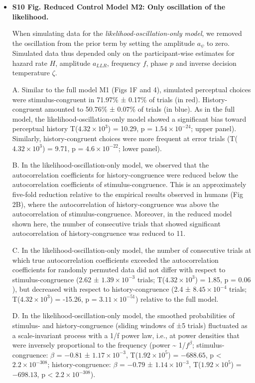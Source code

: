 \documentclass[
]{article}
\begin{document}
\begin{itemize}
\item \textbf{S10 Fig. Reduced Control Model M2: Only oscillation of the likelihood.}

When simulating data for the
\emph{likelihood-oscillation-only model}, we removed the oscillation
from the prior term by setting the amplitude \(a_{\psi}\) to zero.
Simulated data thus depended only on the participant-wise estimates for
hazard rate \(H\), amplitude \(a_{LLR}\), frequency \(f\), phase \(p\)
and inverse decision temperature \(\zeta\).

A. Similar to the full model M1 (Figs 1F and 4), simulated
perceptual choices were stimulus-congruent in 71.97\% ± 0.17\% of trials
(in red). History-congruent amounted to 50.76\% ± 0.07\% of trials (in
blue). As in the full model, the likelihood-oscillation-only model
showed a significant bias toward perceptual history
T(\ensuremath{4.32\times 10^{3}}) = 10.29, p =
\(\ensuremath{1.54\times 10^{-24}}\); upper panel). Similarly,
history-congruent choices were more frequent at error trials
(T(\ensuremath{4.32\times 10^{3}}) = 9.71, p =
\(\ensuremath{4.6\times 10^{-22}}\); lower panel).

B. In the likelihood-oscillation-only model, we observed that the
autocorrelation coefficients for history-congruence were reduced below
the autocorrelation coefficients of stimulus-congruence. This is an
approximately five-fold reduction relative to the empirical results
observed in humans (Fig 2B), where the autocorrelation of
history-congruence was above the autocorrelation of stimulus-congruence.
Moreover, in the reduced model shown here, the number of consecutive
trials that showed significant autocorrelation of history-congruence was
reduced to 11.

C. In the likelihood-oscillation-only model, the number of consecutive
trials at which true autocorrelation coefficients exceeded the
autocorrelation coefficients for randomly permuted data did not differ
with respect to stimulus-congruence (2.62 ±
\ensuremath{1.39\times 10^{-3}} trials;
T(\ensuremath{4.32\times 10^{3}}) = 1.85, p = \(0.06\)), but decreased
with respect to history-congruence (2.4 ±
\ensuremath{8.45\times 10^{-4}} trials;
T(\ensuremath{4.32\times 10^{3}}) = -15.26, p =
\(\ensuremath{3.11\times 10^{-51}}\)) relative to the full model.

D. In the likelihood-oscillation-only model, the smoothed probabilities
of stimulus- and history-congruence (sliding windows of ±5 trials)
fluctuated as a scale-invariant process with a 1/f power law, i.e., at
power densities that were inversely proportional to the frequency (power
\textasciitilde{} 1/\(f^\beta\); stimulus-congruence: \(\beta\) =
\(-0.81\) ± \(\ensuremath{1.17\times 10^{-3}}\),
T(\(\ensuremath{1.92\times 10^{5}}\)) = \(-688.65\), p < \(\ensuremath{2.2\times 10^{-308}}\);
history-congruence: \(\beta\) = \(-0.79\) ±
\(\ensuremath{1.14\times 10^{-3}}\),
T(\(\ensuremath{1.92\times 10^{5}}\)) = \(-698.13\), p < \(\ensuremath{2.2\times 10^{-308}}\)).


\end{itemize}
\end{document}
